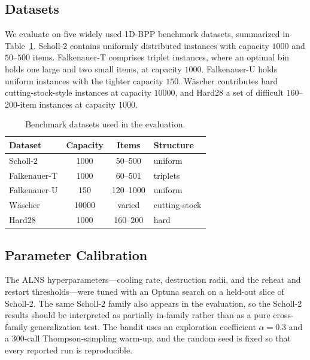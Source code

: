 \documentclass[conference]{IEEEtran}
\begin{document}
\subsection{Datasets}
We evaluate on five widely used 1D-BPP benchmark datasets, summarized in
Table~\ref{tab:datasets}. Scholl-2 contains uniformly distributed instances with
capacity $1000$ and $50$--$500$ items. Falkenauer-T comprises triplet instances,
where an optimal bin holds one large and two small items, at capacity $1000$.
Falkenauer-U holds uniform instances with the tighter capacity $150$. W\"ascher
contributes hard cutting-stock-style instances at capacity $10000$, and Hard28 a
set of difficult $160$--$200$-item instances at capacity $1000$.

\begin{table}[htbp]
	\caption{Benchmark datasets used in the evaluation.}
	\label{tab:datasets}
	\centering
	\begin{tabular}{l c c l}
		\hline
		\textbf{Dataset} & \textbf{Capacity} & \textbf{Items} & \textbf{Structure} \\
		\hline
		Scholl-2         & 1000              & 50--500        & uniform            \\
		Falkenauer-T     & 1000              & 60--501        & triplets           \\
		Falkenauer-U     & 150               & 120--1000      & uniform            \\
		W\"ascher        & 10000             & varied         & cutting-stock      \\
		Hard28           & 1000              & 160--200       & hard               \\
		\hline
	\end{tabular}
\end{table}

\subsection{Parameter Calibration}
The ALNS hyperparameters---cooling rate, destruction radii, and the reheat and
restart thresholds---were tuned with an Optuna search on a held-out slice of
Scholl-2. The same Scholl-2 family also appears in the evaluation, so the Scholl-2
results should be interpreted as partially in-family rather than as a pure
cross-family generalization test. The bandit uses an exploration coefficient
$\alpha=0.3$ and a $300$-call Thompson-sampling warm-up, and the random seed is
fixed so that every reported run is reproducible.
\end{document}

